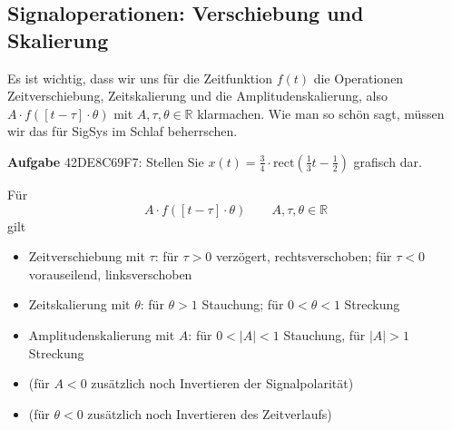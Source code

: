 \subsection{Signaloperationen: Verschiebung und Skalierung}
\label{sec:42DE8C69F7}
\begin{Ziel}
Es ist wichtig, dass wir uns für die Zeitfunktion $f(t)$
die Operationen
Zeitverschiebung,
Zeitskalierung und die Amplitudenskalierung, also
$A \cdot f(\left[t-\tau\right]\cdot \theta)$ mit $A,\tau,\theta\in\mathbb{R}$
klarmachen.
%
Wie man so schön sagt, müssen wir das für SigSys im Schlaf beherrschen.
\end{Ziel}
\textbf{Aufgabe} {\tiny 42DE8C69F7}: Stellen Sie
{$x(t) = \frac{3}{4} \cdot \mathrm{rect}(\frac{1}{3} t-\frac{1}{2})$}
grafisch dar.
\begin{Werkzeug}
Für
\begin{equation}
A \cdot f(\left[t-\tau\right]\cdot \theta)  \qquad A,\tau,\theta\in\mathbb{R}
\end{equation}
gilt
\begin{itemize}
  \item Zeitverschiebung mit
  $\tau$: für $\tau>0$ verzögert, rechtsverschoben; für $\tau<0$ vorauseilend, linksverschoben
  \item Zeitskalierung mit $\theta$: für $\theta>1$ Stauchung; für $0<\theta<1$ Streckung
  \item Amplitudenskalierung mit $A$: für $0<|A|<1$ Stauchung, für $|A|>1$ Streckung
  \item (für $A<0$ zusätzlich noch Invertieren der Signalpolarität)
  \item (für $\theta<0$ zusätzlich noch Invertieren des Zeitverlaufs)
\end{itemize}
\end{Werkzeug}
